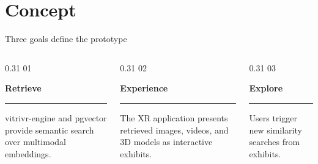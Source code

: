 \section{Concept}
\begin{frame}[c]{Three goals define the prototype}
\begin{columns}[T,onlytextwidth]
  \begin{column}{0.31\textwidth}
    \textcolor{unired}{\LARGE 01}

    \vspace{0.1cm}
    \large \textbf{Retrieve}

    \vspace{0.12cm}
    \color{unimint}\rule{\linewidth}{1.6pt}

    \vspace{0.2cm}
    \small
    vitrivr-engine and pgvector provide semantic search over multimodal embeddings.
  \end{column}
  \begin{column}{0.31\textwidth}
    \textcolor{unired}{\LARGE 02}

    \vspace{0.1cm}
    \large \textbf{Experience}

    \vspace{0.12cm}
    \color{unimint}\rule{\linewidth}{1.6pt}

    \vspace{0.2cm}
    \small
    The XR application presents retrieved images, videos, and 3D models as interactive exhibits.
  \end{column}
  \begin{column}{0.31\textwidth}
    \textcolor{unired}{\LARGE 03}

    \vspace{0.1cm}
    \large \textbf{Explore}

    \vspace{0.12cm}
    \color{unimint}\rule{\linewidth}{1.6pt}

    \vspace{0.2cm}
    \small
    Users trigger new similarity searches from exhibits.
  \end{column}
\end{columns}
\end{frame}
